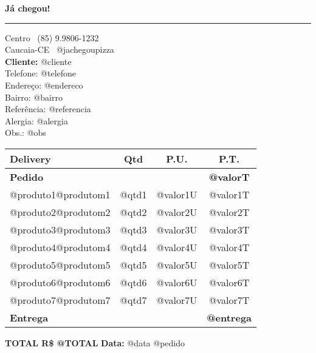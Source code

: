 \documentclass{article}
\begin{document}
\hfil{\large \bf Já chegou!}\hfil %
\smallskip\break %
\hrule %

\noindent Centro \hfill\faWhatsapp\ (85) 9.9806-1232 \\ %
Caucaia-CE \hfill\faInstagram\ @jachegoupizza
\\ 

{\bf \noindent Cliente:} @cliente \\ %
\noindent Telefone: @telefone \\ %
Endereço: @endereco \\
Bairro: @bairro \\
Referência: @referencia \\
Alergia: @alergia \\
Obs.: @obs\\

\begin{table}[!h]
    \centering
    \begin{tabularx}{\textwidth}{Xccc}
    \hline \textbf{Delivery\hfill} & \textbf{Qtd} & \textbf{P.U.} & \textbf{P.T.} \\
    \hline  \textbf{Pedido}     &       &          & \textbf{@valorT}  \\
            @produto1@produtom1 & @qtd1 & @valor1U & @valor1T \\
            @produto2@produtom2 & @qtd2 & @valor2U & @valor2T \\
            @produto3@produtom3 & @qtd3 & @valor3U & @valor3T \\
            @produto4@produtom4 & @qtd4 & @valor4U & @valor4T \\
            @produto5@produtom5 & @qtd5 & @valor5U & @valor5T \\
            @produto6@produtom6 & @qtd6 & @valor6U & @valor6T \\
            @produto7@produtom7 & @qtd7 & @valor7U & @valor7T \\
            \textbf{Entrega}    &       &          & \textbf{@entrega} \\ \hline
    \end{tabularx}
\end{table}
\hfill{\textbf{TOTAL R\$ @TOTAL}}
\vfill {\noindent \bf Data:} @data \hfill @pedido
\end{document}
